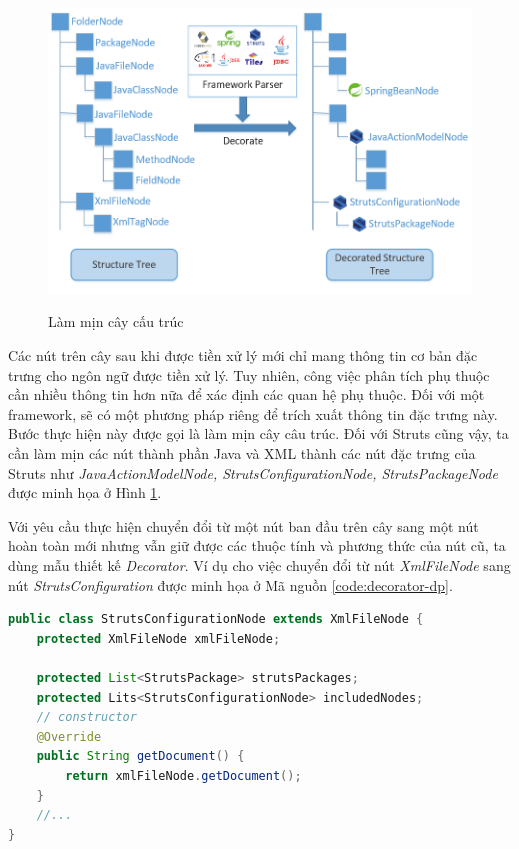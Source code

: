 \documentclass[12pt]{report}
\begin{document}
\begin{figure}[h]
	\centering
	\includegraphics[scale=0.6]{lam-min}
	\label{fig:lam-min}
	\caption{Làm mịn cây cấu trúc}
\end{figure}

Các nút trên cây sau khi được tiền xử lý mới chỉ mang thông tin cơ bản đặc trưng cho ngôn ngữ được tiền xử lý. Tuy nhiên, công việc phân tích phụ thuộc cần nhiều thông tin hơn nữa để xác định các quan hệ phụ thuộc. Đối với một framework, sẽ có một phương pháp riêng để trích xuất thông tin đặc trưng này. Bước thực hiện này được gọi là làm mịn cây câu trúc. Đối với Struts cũng vậy, ta cần làm mịn các nút thành phần Java và XML thành các nút đặc trưng của Struts như \textit{JavaActionModelNode, StrutsConfigurationNode, StrutsPackageNode} được minh họa ở Hình \ref{fig:lam-min}.

Với yêu cầu thực hiện chuyển đổi từ một nút ban đầu trên cây sang một nút hoàn toàn mới nhưng vẫn giữ được các thuộc tính và phương thức của nút cũ, ta dùng mẫu thiết kế \textit{Decorator}. Ví dụ cho việc chuyển đổi từ nút \textit{XmlFileNode} sang nút \textit{StrutsConfiguration} được minh họa ở Mã nguồn \ref{code:decorator-dp}.

\begin{lstlisting}[language=Java,
caption={Ví dụ sử dụng mẫu thiết kế Decorator},label={code:decorator-dp}]
public class StrutsConfigurationNode extends XmlFileNode {
	protected XmlFileNode xmlFileNode;
	
	protected List<StrutsPackage> strutsPackages;
	protected Lits<StrutsConfigurationNode> includedNodes;
	// constructor
	@Override
	public String getDocument() {
		return xmlFileNode.getDocument();
	}
	//...
}
\end{lstlisting}
\end{document}
